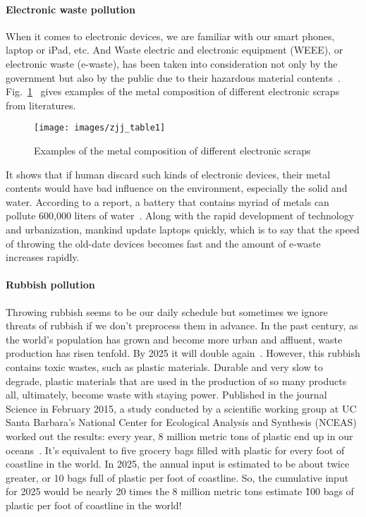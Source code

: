 \documentclass[letterpaper, twocolumn, 10pt, conference]{IEEEtran}
\begin{document}
\paragraph{Electronic waste pollution}

When it comes to electronic devices, we are familiar with our smart phones, laptop or iPad, etc. And Waste electric and electronic equipment (WEEE), or electronic waste (e-waste), has been taken into consideration not only by the government but also by the public due to their hazardous material contents~\cite{ec2000draft, cui2003mechanical, epceu2003directive}. Fig.~\ref{fig:zjj:table1}~\cite{hoornweg2012waste} gives examples of the metal composition of different electronic scraps from literatures. 

\begin{figure}[h!]
        \centering
        \texttt{[image: images/zjj\_table1]}
        \caption{Examples of the metal composition of different electronic scraps}
        \label{fig:zjj:table1}
\end{figure}

It shows that if human discard such kinds of electronic devices, their metal contents would have bad influence on the environment, especially the solid and water. According to a report, a battery that contains myriad of metals can pollute 600,000 liters of water~\cite{battery-pollution2002}. Along with the rapid development of technology and urbanization, mankind update laptops quickly, which is to say that the speed of throwing the old-date devices becomes fast and the amount of e-waste increases rapidly. 

\paragraph{Rubbish pollution}

Throwing rubbish seems to be our daily schedule but sometimes we ignore threats of rubbish if we don't preprocess them in advance. In the past century, as the world's population has grown and become more urban and affluent, waste production has risen tenfold. By 2025 it will double again~\cite{spalding1997new}. However, this rubbish contains toxic wastes, such as plastic materials. Durable and very slow to degrade, plastic materials that are used in the production of so many products all, ultimately, become waste with staying power. Published in the journal Science in February 2015, a study conducted by a scientific working group at UC Santa Barbara's National Center for Ecological Analysis and Synthesis (NCEAS) worked out the results: every year, 8 million metric tons of plastic end up in our oceans~\cite{ocean-plastic2010}. It's equivalent to five grocery bags filled with plastic for every foot of coastline in the world. In 2025, the annual input is estimated to be about twice greater, or 10 bags full of plastic per foot of coastline. So, the cumulative input for 2025 would be nearly 20 times the 8 million metric tons estimate \~ 100 bags of plastic per foot of coastline in the world!
\end{document}
